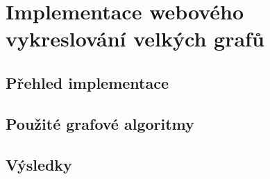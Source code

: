\chapter{Implementace webového vykreslování velkých grafů}

\section{Přehled implementace}

\section{Použité grafové algoritmy}

\section{Výsledky}